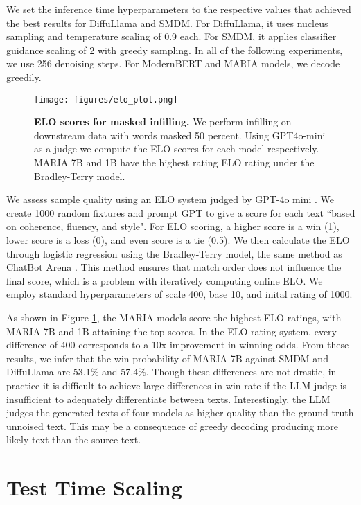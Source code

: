 We set the inference time hyperparameters to the respective values that achieved the best results for DiffuLlama and SMDM. For DiffuLlama, it uses nucleus sampling \cite{holtzman2020curiouscaseneuraltext} and temperature scaling of 0.9 each. For SMDM, it applies classifier guidance scaling of 2 with greedy sampling. In all of the following experiments, we use 256 denoising steps. For ModernBERT and MARIA models, we decode greedily.

\begin{figure}[t]
    \centering
    \texttt{[image: figures/elo\_plot.png]}
    \caption{\textbf{ELO scores for masked infilling.} We perform infilling on downstream data with words masked 50 percent. Using GPT4o-mini as a judge we compute the ELO scores for each model respectively. MARIA 7B and 1B have the highest rating ELO rating under the Bradley-Terry model.}
    \label{fig:elo}
\end{figure}

We assess sample quality using an ELO system judged by GPT-4o mini \cite{achiam2023gpt}. We create 1000 random fixtures and prompt GPT to give a score for each text ``based on coherence, fluency, and style". For ELO scoring, a higher score is a win (1), lower score is a loss (0), and even score is a tie (0.5). We then calculate the ELO through logistic regression using the Bradley-Terry model, the same method as ChatBot Arena \cite{chiang2024chatbotarenaopenplatform}. This method ensures that match order does not influence the final score, which is a problem with iteratively computing online ELO. We employ standard hyperparameters of scale 400, base 10, and inital rating of 1000.

As shown in Figure \ref{fig:elo}, the MARIA models score the highest ELO ratings, with MARIA 7B and 1B attaining the top scores. In the ELO rating system, every difference of 400 corresponds to a 10x improvement in winning odds. From these results, we infer that the win probability of MARIA 7B against SMDM and DiffuLlama are 53.1\% and 57.4\%. Though these differences are not drastic, in practice it is difficult to achieve large differences in win rate if the LLM judge is insufficient to adequately differentiate between texts. Interestingly, the LLM judges the generated texts of four models as higher quality than the ground truth unnoised text. This may be a consequence of greedy decoding producing more likely text than the source text.

\section*{Test Time Scaling}

